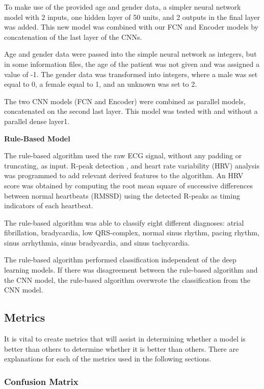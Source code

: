 To make use of the provided age and gender data, a simpler neural network model with 2 inputs, one hidden layer of 50 units, and 2 outputs in the final layer was added. This new model was combined with our FCN and Encoder models by concatenation of the last layer of the CNNs.

Age and gender data were passed into the simple neural network as integers, but in some information files, the age of the patient was not given and was assigned a value of -1. The gender data was transformed into integers, where a male was set equal to 0, a female equal to 1, and an unknown was set to 2.

The two CNN models (FCN and Encoder) were combined as parallel models, concatenated on the second last layer. This model was tested with and without a parallel dense layer1.

\textbf{Rule-Based Model}

The rule-based algorithm used the raw ECG signal, without any padding or truncating, as input. R-peak detection \cite{4122029}, and heart rate variability (HRV) analysis was programmed to add relevant derived features to the algorithm. An HRV score was obtained by computing the root mean square of successive differences between normal heartbeats (RMSSD) using the detected R-peaks as timing indicators of each heartbeat.

The rule-based algorithm was able to classify eight different diagnoses: atrial fibrillation, bradycardia, low QRS-complex, normal sinus rhythm, pacing rhythm, sinus arrhythmia, sinus bradycardia, and sinus tachycardia.

The rule-based algorithm performed classification independent of the deep learning models. If there was disagreement between the rule-based algorithm and the CNN model, the rule-based algorithm overwrote the classification from the CNN model.


\subsection{Metrics} \label{3metrics}

It is vital to create metrics that will assist in determining whether a model is better than others to determine whether it is better than others. There are explanations for each of the metrics used in the following sections.


\subsubsection{Confusion Matrix} \label{4confmatrix}

